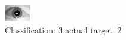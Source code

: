 \begin{figure}[h!]
\begin{center}
\includegraphics[width=0.60\columnwidth]{figures/ID1644_class_3_target_2.png}
\end{center}
\caption{ Classification: 3 actual target: 2}
\label{fig:ID1644_class_3_target_2}
\end{figure}
